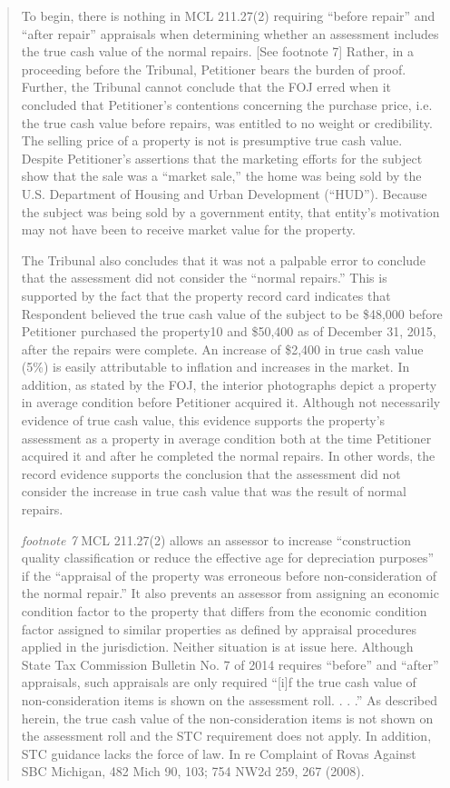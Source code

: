 \documentclass[12pt,\documentclassflag]{michiganCourtOfAppealsBrief}
\begin{document}
\begin{quotation}
To begin, there is nothing in MCL 211.27(2) requiring ``before repair'' and ``after repair'' appraisals when determining whether an assessment includes the true cash value of the normal repairs. [See footnote 7] Rather, in a proceeding before the Tribunal, Petitioner bears the burden of proof. Further, the Tribunal cannot conclude that the FOJ erred when it concluded that Petitioner's contentions concerning the purchase price, i.e. the true cash value before repairs, was entitled to no weight or credibility. The selling price of a property is not is presumptive true cash value. Despite Petitioner's assertions that the marketing efforts for the subject show that the sale was a ``market sale,'' the home was being sold by the U.S. Department of Housing and Urban Development (``HUD''). Because the subject was being sold by a government entity, that entity's motivation may not have been to receive market value for the property.

The Tribunal also concludes that it was not a palpable error to conclude that the assessment did not consider the ``normal repairs.'' This is supported by the fact that the property record card indicates that Respondent believed the true cash value of the subject to be \$48,000 before Petitioner purchased the property10 and \$50,400 as of December 31, 2015, after the repairs were complete. An increase of \$2,400 in true cash value (5\%) is easily attributable to inflation and increases in the market. In addition, as stated by the FOJ, the interior photographs depict a property in average condition before Petitioner acquired it. Although not necessarily evidence of true cash value, this evidence supports the property's assessment as a property in average condition both at the time Petitioner acquired it and after he completed the normal repairs. In other words, the record evidence supports the conclusion that the assessment did not consider the increase in true cash value that was the result of normal repairs.

\textit{footnote 7} MCL 211.27(2) allows an assessor to increase ``construction quality classification or reduce the effective age for depreciation purposes'' if the ``appraisal of the property was erroneous before non-consideration of the normal repair.'' It also prevents an assessor from assigning an economic condition factor to the property that differs from the economic condition factor assigned to similar properties as defined by appraisal procedures applied in the jurisdiction. Neither situation is at issue here. Although State Tax Commission Bulletin No. 7 of 2014 requires ``before'' and ``after'' appraisals, such appraisals are only required ``[i]f the true cash value of non-consideration items is shown on the assessment roll. . . .'' As described herein, the true cash value of the non-consideration items is not shown on the assessment roll and the STC requirement does not apply. In addition, STC guidance lacks the force of law. In re Complaint of Rovas Against SBC Michigan, 482 Mich 90, 103; 754 NW2d 259, 267 (2008).

\end{quotation}
\end{document}

